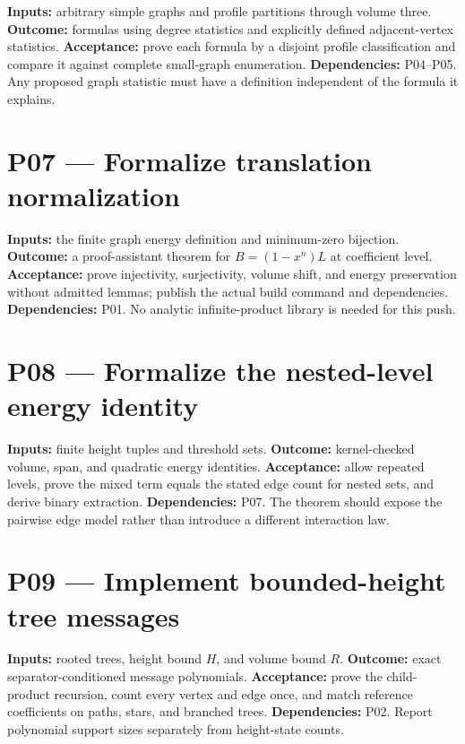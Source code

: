 \documentclass[
  11pt,
  a4paper,
]{report}
\begin{document}
\textbf{Inputs:} arbitrary simple graphs and profile partitions through
volume three. \textbf{Outcome:} formulas using degree statistics and
explicitly defined adjacent-vertex statistics. \textbf{Acceptance:}
prove each formula by a disjoint profile classification and compare it
against complete small-graph enumeration. \textbf{Dependencies:}
P04--P05. Any proposed graph statistic must have a definition
independent of the formula it explains.

\hypertarget{p07-formalize-translation-normalization}{%
\section{P07 --- Formalize translation
normalization}\label{p07-formalize-translation-normalization}}

\textbf{Inputs:} the finite graph energy definition and minimum-zero
bijection. \textbf{Outcome:} a proof-assistant theorem for
\(B=(1-x^n)L\) at coefficient level. \textbf{Acceptance:} prove
injectivity, surjectivity, volume shift, and energy preservation without
admitted lemmas; publish the actual build command and dependencies.
\textbf{Dependencies:} P01. No analytic infinite-product library is
needed for this push.

\hypertarget{p08-formalize-the-nested-level-energy-identity}{%
\section{P08 --- Formalize the nested-level energy
identity}\label{p08-formalize-the-nested-level-energy-identity}}

\textbf{Inputs:} finite height tuples and threshold sets.
\textbf{Outcome:} kernel-checked volume, span, and quadratic energy
identities. \textbf{Acceptance:} allow repeated levels, prove the mixed
term equals the stated edge count for nested sets, and derive binary
extraction. \textbf{Dependencies:} P07. The theorem should expose the
pairwise edge model rather than introduce a different interaction law.

\hypertarget{p09-implement-bounded-height-tree-messages}{%
\section{P09 --- Implement bounded-height tree
messages}\label{p09-implement-bounded-height-tree-messages}}

\textbf{Inputs:} rooted trees, height bound \(H\), and volume bound
\(R\). \textbf{Outcome:} exact separator-conditioned message
polynomials. \textbf{Acceptance:} prove the child-product recursion,
count every vertex and edge once, and match reference coefficients on
paths, stars, and branched trees. \textbf{Dependencies:} P02. Report
polynomial support sizes separately from height-state counts.
\end{document}
